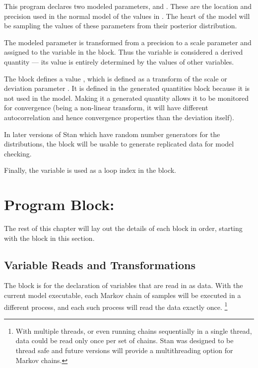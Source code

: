 This program declares two modeled parameters,  and
.  These are the location and precision used in the normal
model of the values in .  The heart of the model will be
sampling the values of these parameters from their posterior
distribution.

The modeled parameter  is transformed from a precision to
a scale parameter and assigned to the variable  in the
 block. Thus the variable 
is considered a derived quantity --- its value is entirely determined
by the values of other variables.

The  block defines a value
, which is defined as a transform of the scale or
deviation parameter .  It is defined in the generated
quantities block because it is not used in the model.  Making it
a generated quantity allows it to be monitored for convergence (being
a non-linear transform, it will have different autocorrelation and
hence convergence properties than the deviation itself).

In later versions of Stan which have random number generators for
the distributions, the  block will be
usable to generate replicated data for model checking.

Finally, the variable  is used as a loop index in the
 block.


\section{Program Block: }

The rest of this chapter will lay out the details of each block in
order, starting with the  block in this section.

\subsection{Variable Reads and Transformations}

The  block is for the declaration of variables that are
read in as data.  With the current model executable, each Markov chain
of samples will be executed in a different process, and each such
process will read the data exactly once.%
%
\footnote{With multiple threads, or even running chains sequentially
  in a single thread, data could be read only once per set of
  chains. Stan was designed to be thread safe and future versions
  will provide a multithreading option for Markov chains.\label{thread.footnote}}
%

